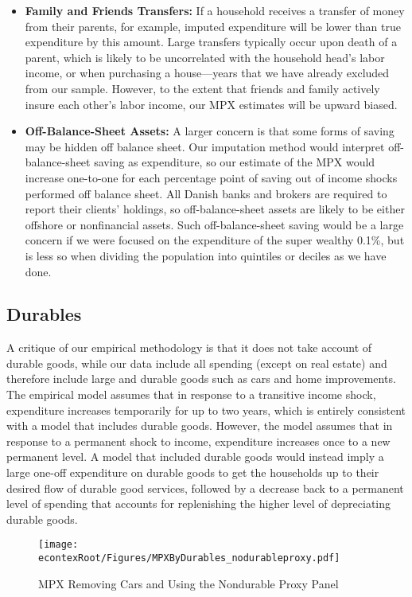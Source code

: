 \documentclass[titlepage]{\econtex}\newcommand{\texname}{ConsumptionHeterogeneity}
\begin{document}
\begin{itemize}
		\item \textbf{Family and Friends Transfers:} If a household receives a transfer of money from their parents, for example, imputed expenditure will be lower than true expenditure by this amount. Large transfers typically occur upon death of a parent, which is likely to be uncorrelated with the household head's labor income, or when purchasing a house---years that we have already excluded from our sample. However, to the extent that friends and family actively insure each other's labor income, our MPX estimates will be upward biased.
		\item \textbf{Off-Balance-Sheet Assets:} A larger concern is that some forms of saving may be hidden off balance sheet. Our imputation method would interpret off-balance-sheet saving as expenditure, so our estimate of the MPX would increase one-to-one for each percentage point of saving out of income shocks performed off balance sheet. All Danish banks and brokers are required to report their clients' holdings, so off-balance-sheet assets are likely to be either offshore or nonfinancial assets. Such off-balance-sheet saving would be a large concern if we were focused on the expenditure of the super wealthy 0.1\%, but is less so when dividing the population into quintiles or deciles as we have done. 
	\end{itemize}
	
	\subsection{Durables} \label{durables}
	A critique of our empirical methodology is that it does not take account of durable goods, while our data include all spending (except on real estate) and therefore include large and durable goods such as cars and home improvements. The empirical model assumes that in response to a transitive income shock, expenditure increases temporarily for up to two years, which is entirely consistent with a model that includes durable goods. However, the model assumes that in response to a permanent shock to income, expenditure increases once to a new permanent level. A model that included durable goods would instead imply a large one-off expenditure on durable goods to get the households up to their desired flow of durable good services, followed by a decrease back to a permanent level of spending that accounts for replenishing the higher level of depreciating durable goods.
	\begin{figure} 
		\begin{centering}
			\texttt{[image: \\econtexRoot/Figures/MPXByDurables\_nodurableproxy.pdf]}
			\caption{MPX Removing Cars and Using the Nondurable Proxy Panel}
			\label{fig:MPXByDurables}
		\end{centering}
	\end{figure}
	
\end{document}
